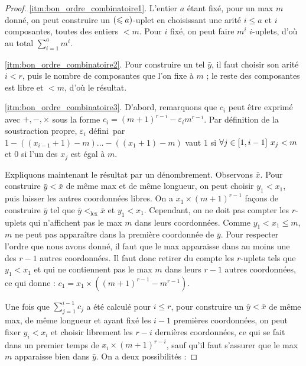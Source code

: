 		\begin{proof}
			\ref{itm:bon_ordre_combinatoire1}. L'entier $a$ étant fixé, pour un max $m$ donné, on peut construire un $\left( \leqslant a \right)$-uplet en choisissant une arité $i \leqslant a$ et $i$ composantes, toutes des entiers $< m$. Pour $i$ fixé, on peut faire $m^{i}$ $i$-uplets, d'où au total $\sum_{i=1}^{a} m^i$.
			
			\ref{itm:bon_ordre_combinatoire2}. Pour construire un tel $\bar{y}$, il faut choisir son arité $i<r$, puis le nombre de composantes que l'on fixe à $m$ ; le reste des composantes est libre et $<m$, d'où le résultat.
			
			\ref{itm:bon_ordre_combinatoire3}. D'abord, remarquons que $c_i$ peut être exprimé avec $+,-,\times$ sous la forme $c_i = \left( m+1 \right)^{r-i} - \varepsilon_i m^{r-i}$. Par définition de la soustraction propre, $\varepsilon_i$ défini\footnotemark\ par $1 - \left(\left(x_{i-1} +1 \right)-m\right) \dots  - \left(\left(x_1 +1 \right)-m\right)$ vaut $1$ si $ \forall j \in \left[\!\!\>\!\left[ 1 , i-1 \right]\!\!\>\!\right] \: x_j < m$ et $0$ si l'un des $x_j$ est égal à $m$.
			
			
			Expliquons maintenant le résultat par un dénombrement. Observons $\bar{x}$. Pour construire $\bar{y} < \bar{x}$ de même max et de même longueur, on peut choisir $y_1<x_1$, puis laisser les autres coordonnées libres. On a $x_1 \times \left(m+1\right)^{r-1}$ façons de construire $\bar{y}$ tel que $\bar{y} <_{\text{lex}} \bar{x}$ et $y_1<x_1$. Cependant, on ne doit pas compter les $r$-uplets qui n'affichent pas le max $m$ dans leurs coordonnées. Comme $y_1 < x_1 \leqslant m$, $m$ ne peut pas apparaître dans la première coordonnée de $\bar{y}$. Pour respecter l'ordre que nous avons donné, il faut que le max apparaisse dans au moins une des $r-1$ autres coordonnées. Il faut donc retirer du compte les $r$-uplets tels que $y_1<x_1$ et qui ne contiennent pas le max $m$ dans leurs $r-1$ autres coordonnées, ce qui donne : $c_1 = x_1 \times \left(\left(m+1\right)^{r-1} - m^{r-1}\right)$.

			
			Une fois que $\sum_{j=1}^{i-1} c_j$ a été calculé pour $i \leqslant r$, pour construire un $\bar{y} < \bar{x}$ de même max, de même longueur et ayant fixé les $i-1$ premières coordonnées, on peut fixer $y_i<x_i$ et choisir librement les $r-i$ dernières coordonnées, ce qui se fait dans un premier temps de $x_i \times \left(m+1\right)^{r-i}$, sauf qu'il faut s'assurer que le max $m$ apparaisse bien dans $\bar{y}$. On a deux possibilités :
			

\end{proof}
